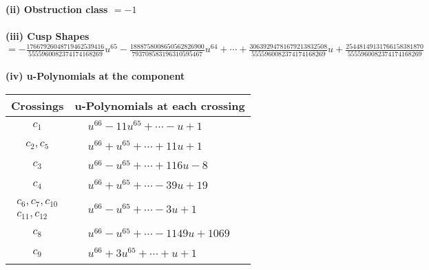 \documentclass[1p]{elsarticle_modified}
\theoremstyle{definition}
\begin{document}
\flushleft \textbf{(ii) Obstruction class $= -1$}\\~\\
\flushleft \textbf{(iii) Cusp Shapes $= -\frac{17667926048719462539416}{5555960082374174168269} u^{65}-\frac{1888758008650562826900}{793708583196310595467} u^{64}+\cdots+\frac{30639294781679213832508}{5555960082374174168269} u+\frac{25448149131766158381870}{5555960082374174168269}$}\\~\\
\newpage\renewcommand{\arraystretch}{1}
\flushleft \textbf{(iv) u-Polynomials at the component}\newline \\
\begin{tabular}{m{50pt}|m{274pt}}
Crossings & \hspace{64pt}u-Polynomials at each crossing \\
\hline $$\begin{aligned}c_{1}\end{aligned}$$&$\begin{aligned}
&u^{66}-11 u^{65}+\cdots- u+1
\end{aligned}$\\
\hline $$\begin{aligned}c_{2},c_{5}\end{aligned}$$&$\begin{aligned}
&u^{66}+u^{65}+\cdots+11 u+1
\end{aligned}$\\
\hline $$\begin{aligned}c_{3}\end{aligned}$$&$\begin{aligned}
&u^{66}- u^{65}+\cdots+116 u-8
\end{aligned}$\\
\hline $$\begin{aligned}c_{4}\end{aligned}$$&$\begin{aligned}
&u^{66}+u^{65}+\cdots-39 u+19
\end{aligned}$\\
\hline $$\begin{aligned}c_{6},c_{7},c_{10}\\c_{11},c_{12}\end{aligned}$$&$\begin{aligned}
&u^{66}- u^{65}+\cdots-3 u+1
\end{aligned}$\\
\hline $$\begin{aligned}c_{8}\end{aligned}$$&$\begin{aligned}
&u^{66}- u^{65}+\cdots-1149 u+1069
\end{aligned}$\\
\hline $$\begin{aligned}c_{9}\end{aligned}$$&$\begin{aligned}
&u^{66}+3 u^{65}+\cdots+u+1
\end{aligned}$\\
\hline
\end{tabular}\\~\\
\end{document}
